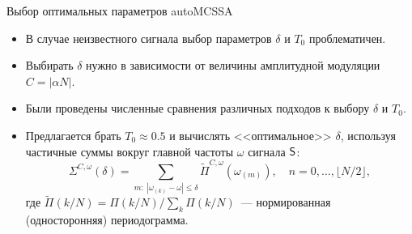 \documentclass[pdf,notheorems,10pt,intlimits,unicode]{beamer}
\begin{document}
\begin{frame}{Выбор оптимальных параметров autoMCSSA}

    \begin{itemize}
        \item В случае неизвестного сигнала выбор параметров $\delta$ и $T_0$ проблематичен.
        \item Выбирать $\delta$ нужно в зависимости от величины амплитудной модуляции $C=|\alpha N|$.
        \item Были проведены численные сравнения различных подходов к выбору $\delta$ и $T_0$.
        \item Предлагается брать $T_0\approx 0.5$ и вычислять <<оптимальное>> $\delta$, используя частичные суммы вокруг главной частоты $\omega$ сигнала $\mathsf{S}$:
              \[
                  \Sigma^{C, \omega}(\delta)=\sum_{m:~|\omega_{(k)} - \omega| \leqslant \delta} \tilde\Pi^{C, \omega}\left(\omega_{(m)}\right), \quad n=0,\ldots,\lfloor N / 2 \rfloor,
              \]
              где $\tilde \Pi(k / N) = \Pi(k / N) / \sum_{k} \Pi(k / N)$~--- нормированная (односторонняя) периодограмма.
    \end{itemize}


\end{frame}
\end{document}
